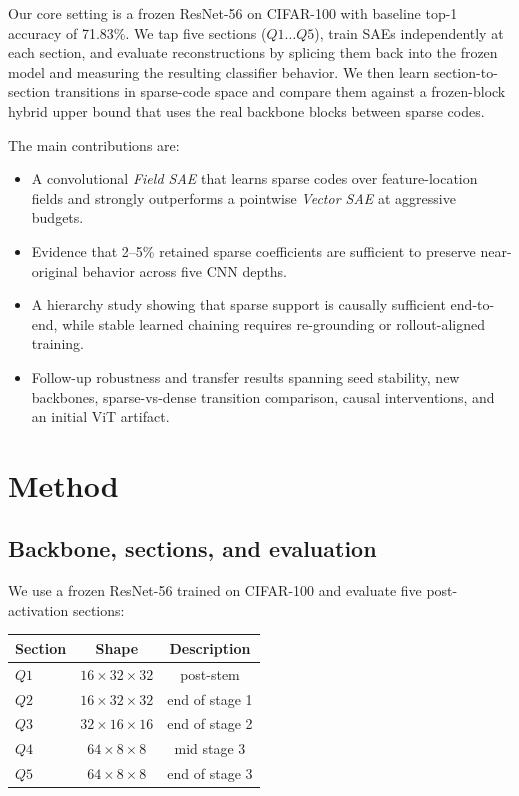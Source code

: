 \documentclass[10pt,twocolumn]{article}
\begin{document}
Our core setting is a frozen ResNet-56 on CIFAR-100 with baseline top-1 accuracy of 71.83\%. We tap five sections ($Q1\dots Q5$), train SAEs independently at each section, and evaluate reconstructions by splicing them back into the frozen model and measuring the resulting classifier behavior. We then learn section-to-section transitions in sparse-code space and compare them against a frozen-block hybrid upper bound that uses the real backbone blocks between sparse codes.

The main contributions are:
\begin{itemize}[leftmargin=1.2em]
  \item A convolutional \emph{Field SAE} that learns sparse codes over feature-location fields and strongly outperforms a pointwise \emph{Vector SAE} at aggressive budgets.
  \item Evidence that 2--5\% retained sparse coefficients are sufficient to preserve near-original behavior across five CNN depths.
  \item A hierarchy study showing that sparse support is causally sufficient end-to-end, while stable learned chaining requires re-grounding or rollout-aligned training.
  \item Follow-up robustness and transfer results spanning seed stability, new backbones, sparse-vs-dense transition comparison, causal interventions, and an initial ViT artifact.
\end{itemize}

\section{Method}
\subsection{Backbone, sections, and evaluation}
We use a frozen ResNet-56 trained on CIFAR-100 and evaluate five post-activation sections:
\begin{center}
\small
\begin{tabular}{lcc}
\toprule
Section & Shape & Description \\
\midrule
$Q1$ & $16 \times 32 \times 32$ & post-stem \\
$Q2$ & $16 \times 32 \times 32$ & end of stage 1 \\
$Q3$ & $32 \times 16 \times 16$ & end of stage 2 \\
$Q4$ & $64 \times 8 \times 8$ & mid stage 3 \\
$Q5$ & $64 \times 8 \times 8$ & end of stage 3 \\
\bottomrule
\end{tabular}
\end{center}
\end{document}

